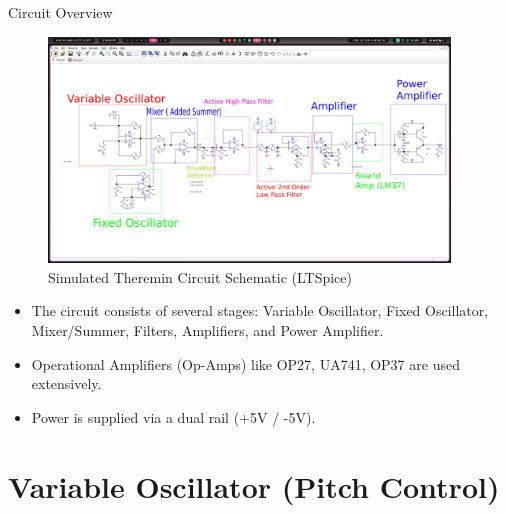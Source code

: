 \documentclass[10pt,xcolor={table,dvipsnames},t]{beamer}
\begin{document}
\begin{frame}{Circuit Overview}
\begin{figure}
    \centering
    \includegraphics[width=0.95\textwidth, height=0.7\textheight, keepaspectratio]{theremin_circuit.png}
    \caption{Simulated Theremin Circuit Schematic (LTSpice)}
    \label{fig:circuit_overview}
\end{figure}
\vspace{-1em}
\scriptsize
\begin{itemize}
    \item The circuit consists of several stages: Variable Oscillator, Fixed Oscillator, Mixer/Summer, Filters, Amplifiers, and Power Amplifier.
    \item Operational Amplifiers (Op-Amps) like OP27, UA741, OP37 are used extensively.
    \item Power is supplied via a dual rail (+5V / -5V).
\end{itemize}
\end{frame}

\section{Variable Oscillator (Pitch Control)}
\end{document}
